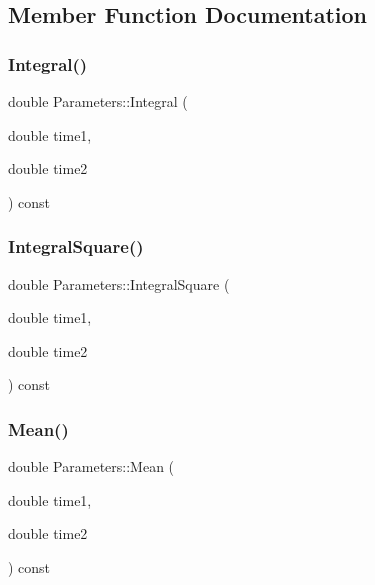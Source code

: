 \subsection{Member Function Documentation}
\hypertarget{classParameters_a11d8cbc54d33121ed02365be15568643}{}\label{classParameters_a11d8cbc54d33121ed02365be15568643} 
\subsubsection{\texorpdfstring{Integral()}{Integral()}}
{\footnotesize\ttfamily double Parameters\+::\+Integral (\begin{DoxyParamCaption}\item[{double}]{time1,  }\item[{double}]{time2 }\end{DoxyParamCaption}) const\hspace{0.3cm}{\ttfamily [inline]}}

\hypertarget{classParameters_a6bd34053b273fc591258ccbf4380d501}{}\label{classParameters_a6bd34053b273fc591258ccbf4380d501} 
\subsubsection{\texorpdfstring{Integral\+Square()}{IntegralSquare()}}
{\footnotesize\ttfamily double Parameters\+::\+Integral\+Square (\begin{DoxyParamCaption}\item[{double}]{time1,  }\item[{double}]{time2 }\end{DoxyParamCaption}) const\hspace{0.3cm}{\ttfamily [inline]}}

\hypertarget{classParameters_a412ab75e26ede3b0ab54dc7df58074a6}{}\label{classParameters_a412ab75e26ede3b0ab54dc7df58074a6} 
\subsubsection{\texorpdfstring{Mean()}{Mean()}}
{\footnotesize\ttfamily double Parameters\+::\+Mean (\begin{DoxyParamCaption}\item[{double}]{time1,  }\item[{double}]{time2 }\end{DoxyParamCaption}) const}

